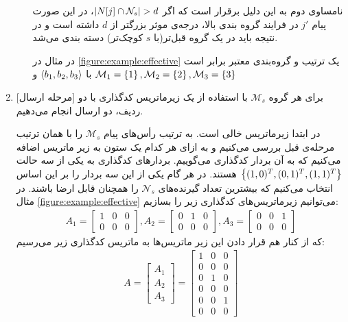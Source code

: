 \begin{enumerate}
\begin{enumerate}
        نامساوی دوم به این دلیل برقرار است که اگر
        $\left|{N[j] \cap \mathcal{N}_s }\right| > d$، در این صورت پیام
        $j'$
        در فرایند گروه بندی بالا، درجه‌ی موثر بزرگتر از
        $d$
        داشته است و در نتیجه باید در یک گروه قبل‌تر(با
        $s$
        کوچک‌تر) دسته بندی می‌شد.

        در مثال در
        \autoref{figure:example:effective}
        یک ترتیب و گروه‌بندی معتبر برابر است با
        $\left< b_1, b_2, b_3 \right>$
        و
        $\mathcal{M}_1 = \left\{ 1 \right\}, \mathcal{M}_2 = \left\{ 2 \right\}, \mathcal{M}_3 = \left\{ 3 \right\}$
    \end{enumerate}
    \item{[مرحله ارسال]}
    برای هر گروه
    $\mathcal{M}_s$
    با استفاده از یک زیرماتریس کدگذاری با دو ردیف، دو ارسال انجام می‌دهیم.

    در ابتدا زیرماتریس خالی است. به ترتیب رأس‌های پیام
    $\mathcal{M}_s$
    را با همان ترتیب مرحله‌ی قبل بررسی می‌کنیم و به ازای هر کدام یک ستون به زیر ماتریس اضافه می‌کنیم که به آن بردار کدگذاری می‌گوییم. بردارهای کدگذاری به یکی از سه حالت
    $\left\{ (1, 0)^T, (0, 1)^T, (1, 1)^T \right\}$
    هستند. در هر گام یکی از این سه بردار را بر این اساس انتخاب می‌کنیم که بیشترین تعداد گیرنده‌های
    $\mathcal{N}_s$
    را همچنان قابل ارضا باشند. در مثال
    \autoref{figure:example:effective}
    می‌توانیم زیرماتریس‌های کدگذاری زیر را بسازیم:
    \begin{align*}
        A_1 = \begin{bmatrix}
                  1 & 0 & 0 \\
                  0 & 0 & 0
        \end{bmatrix},
        A_2 =   \begin{bmatrix}
                    0 & 1 & 0 \\
                    0 & 0 & 0
        \end{bmatrix},
        A_3 =   \begin{bmatrix}
                    0 & 0 & 1 \\
                    0 & 0 & 0
        \end{bmatrix}
    \end{align*}
    که از کنار هم قرار دادن این زیر ماتریس‌ها به ماتریس کدگذاری زیر می‌رسیم:
    \begin{align*}
        A =  \begin{bmatrix}
                 A_1 \\
                 A_2 \\
                 A_3
        \end{bmatrix}
        = \begin{bmatrix}
              1 & 0 & 0 \\
              0 & 0 & 0 \\
              0 & 1 & 0 \\
              0 & 0 & 0 \\
              0 & 0 & 1 \\
              0 & 0 & 0
        \end{bmatrix}
    \end{align*}
\end{enumerate}

